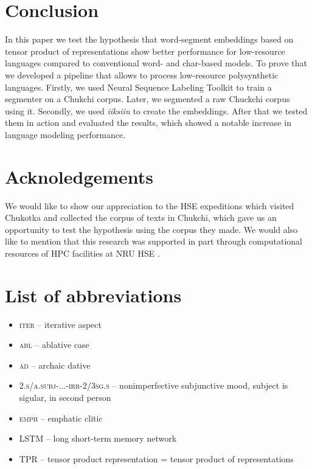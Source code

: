 \documentclass[leqno]{article}
\begin{document}
\section{Conclusion}
In this paper we test the hypothesis that word-segment embeddings based on tensor product
of representations show better performance for low-resource languages compared to conventional word- and char-based models. To prove that we developed a pipeline that allows to process low-resource polysynthetic languages. Firstly, we used Neural Sequence Labeling Toolkit \parencite{yang2018ncrf} to train a segmenter on a Chukchi corpus. Later, we segmented a raw Chuckchi corpus using it. Secondly, we used \textit{iiksiin} \parencite{iiksiin} to create the embeddings. After that we tested them in action and evaluated the results, which showed a notable increase in language modeling performance.

\clearpage
\section*{Acknoledgements}
We would like to show our appreciation to the HSE expeditions which visited Chukotka and collected the corpus of texts in Chukchi, which gave us an opportunity to test the hypothesis using the corpus they made. We would also like to mention that this research was supported in part through computational resources of HPC facilities at NRU HSE \texttrademark. 

\clearpage
\appendix

\section{List of abbreviations}
\begin{itemize}
    \item \textsc{iter} – iterative aspect
    \item \textsc{abl} – ablative case
    \item \textsc{ad} – archaic dative
    \item \textsc{2.s/a.subj-...-irr-2/3sg.s} – nonimperfective subjunctive mood, subject is sigular, in second person
    \item \textsc{emph} – emphatic clitic
    \item LSTM – long short-term memory network
    \item TPR – tensor product representation = tensor product of representations
\end{itemize}

\printbibliography
\end{document}
